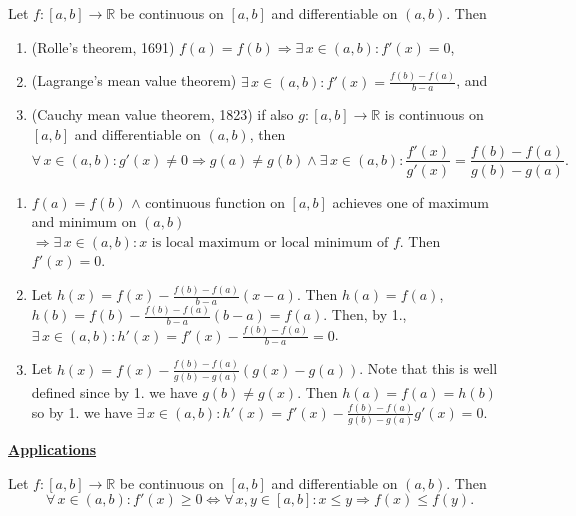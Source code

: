 \documentclass{notes}
\begin{document}
  \begin{thm}
    Let $f \colon [a, b] \to \mathbb R$ be continuous on $[a, b]$ and differentiable on $(a, b)$.
    Then 
    \begin{enumerate}
      \item (Rolle's theorem, 1691) $f(a) = f(b) \Rightarrow \exists \, x \in (a, b): f'(x) = 0$, 

      \item (Lagrange's mean value theorem) $\exists \, x \in (a, b): f'(x) = \frac{f(b) - f(a)}{b - a}$, and 

      \item (Cauchy mean value theorem, 1823) if also $g \colon [a, b] \to \mathbb R$ is continuous on $[a, b]$ and differentiable on $(a, b)$, then 
      \[
        \forall \, x \in (a, b): g'(x) \neq 0 \Rightarrow g(a) \neq g(b) \land \exists \, x \in (a, b): \frac{f'(x)}{g'(x)} = \frac{f(b) - f(a)}{g(b) - g(a)}.
      \]
    \end{enumerate}
  \end{thm}
  
  \begin{prf}
    \begin{enumerate}
      \item $f(a) = f(b)$ $\land$ continuous function on $[a, b]$ achieves one of maximum and minimum on $(a, b)$ $\Rightarrow \exists \, x \in (a, b): \text{$x$ is local maximum or local minimum of $f$}$.
      Then $f'(x) = 0$.
      
      \item Let $h(x) = f(x) - \frac{f(b) - f(a)}{b - a} (x - a)$.
      Then $h(a) = f(a)$, $h(b) = f(b) - \frac{f(b) - f(a)}{b - a} (b - a) = f(a)$.
      Then, by 1., $\exists \, x \in (a, b): h'(x) = f'(x) - \frac{f(b) - f(a)}{b - a} = 0$.
      
      \item Let $h(x) = f(x) - \frac{f(b) - f(a)}{g(b) - g(a)} (g(x) - g(a))$.
      Note that this is well defined since by 1. we have $g(b) \neq g(x)$. %
      Then $h(a) = f(a) = h(b)$ so by 1. we have $\exists \, x \in (a, b): h'(x) = f'(x) - \frac{f(b) - f(a)}{g(b) - g(a)} g'(x) = 0$.
    \end{enumerate}
  \end{prf}
  
  {\boldmath \bfseries \underline{Applications}}
  
  \begin{lem}
    Let $f \colon [a, b] \to \mathbb R$ be continuous on $[a, b]$ and differentiable on $(a, b)$.
    Then 
    \[
      \forall \, x \in (a, b): f'(x) \geq 0 \Leftrightarrow \forall \, x, y \in [a, b]: x \leq y \Rightarrow f(x) \leq f(y).
    \]
  \end{lem}
  
\end{document}
